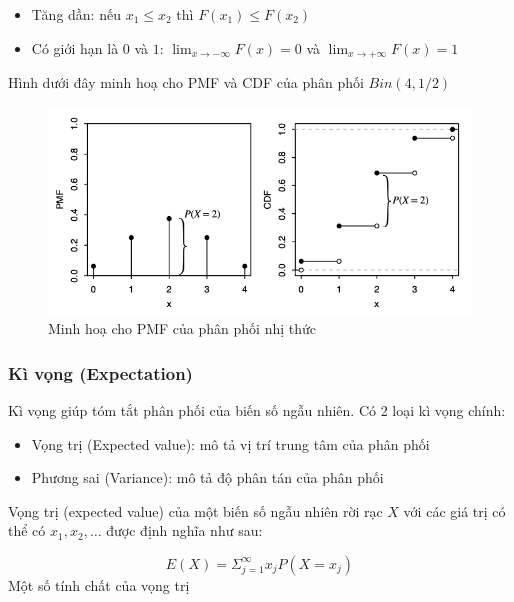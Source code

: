 \documentclass[
]{book}
\providecommand{\tightlist}{%
  \setlength{\itemsep}{0pt}\setlength{\parskip}{0pt}}
\begin{document}
\begin{itemize}
\tightlist
\item
  Tăng dần: nếu \(x_1 \leq x_2\) thì \(F(x_1) \leq F(x_2)\)
\item
  Có giới hạn là \(0\) và \(1\): \(\lim_{x\rightarrow -\infty}F(x) = 0\) và \(\lim_{x\rightarrow +\infty}F(x) = 1\)
\end{itemize}

Hình dưới đây minh hoạ cho PMF và CDF của phân phối \(Bin(4, 1/2)\)

\begin{figure}

{\centering \includegraphics[width=1\linewidth]{figures/Picture10} 

}

\caption{Minh hoạ cho PMF của phân phối nhị thức}\label{fig:unnamed-chunk-8}
\end{figure}

\hypertarget{kuxec-vux1ecdng-expectation}{%
\subsubsection{Kì vọng (Expectation)}\label{kuxec-vux1ecdng-expectation}}

Kì vọng giúp tóm tắt phân phối của biến số ngẫu nhiên. Có 2 loại kì vọng chính:

\begin{itemize}
\tightlist
\item
  Vọng trị (Expected value): mô tả vị trí trung tâm của phân phối
\item
  Phương sai (Variance): mô tả độ phân tán của phân phối
\end{itemize}

Vọng trị (expected value) của một biến số ngẫu nhiên rời rạc \(X\) với các giá trị có thể có \(x_1, x_2, \ldots\) được định nghĩa như sau:

\[
E(X) = \Sigma^\infty_{j = 1} x_j P(X = x_j)
\]
Một số tính chất của vọng trị
\end{document}
